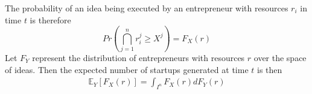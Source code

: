 \documentclass[12pt]{article}
\begin{document}
\begin{comment}
We call an idea \textit{unbounded} for an individual if the idea can be executed and \textit{single bounded} on dimension $k$ if
$$\alpha_i^k = X(\omega{it})^k \wedge  \alpha_i^j > X(\omega{it})^j \; \forall j \ne k \in n$$
\end{comment}

The probability of an idea being executed by an entrepreneur with resources $r_i$ in time $t$ is therefore 
$$Pr\left(\bigcap _{j=1}^n  r_i^j \ge X^j\right) = F_X(r)$$
Let $F_Y$ represent the distribution of entrepreneurs with resources $r$ over the space of ideas. Then the expected number of startups generated at time $t$ is then 
\begin{align}
\mathbb{E}_{Y}[F_X(r)]=\int_{I^n} F_X(r) dF_Y(r)
\end{align}
\end{document}

